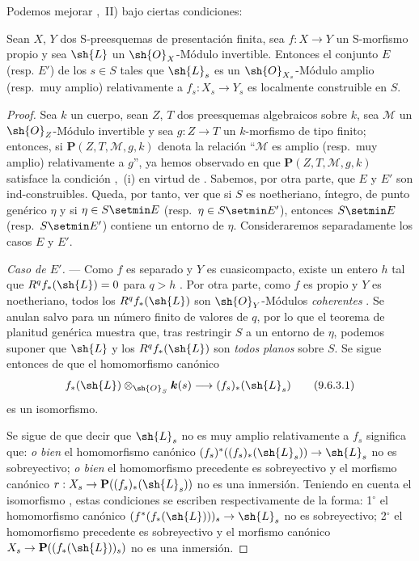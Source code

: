 Podemos mejorar ,~II) bajo ciertas condiciones:

\begin{proposition}[9.6.3]
\label{IV.9.6.3}
Sean $X$, $Y$ dos S-preesquemas de presentación finita, sea $f:X\to Y$ un S-morfismo \textup{propio} y sea $\sh{L}$ un $\sh{O}_X$-Módulo invertible.
Entonces el conjunto $E$ \textup{(resp.} $E'$\textup{)} de los $s\in S$ tales que $\sh{L}_s$ es un $\sh{O}_{X_s}$-Módulo amplio \textup{(resp.}\ muy amplio\textup{)} relativamente a $f_s:X_s\to Y_s$ es localmente construible en $S$.
\end{proposition}

\begin{proof}
Sea $k$ un cuerpo, sean $Z$, $T$ dos preesquemas algebraicos sobre $k$, sea $\mathscr{M}$ un $\sh{O}_Z$-Módulo invertible y sea $g:Z\to T$ un $k$-morfismo de tipo finito; entonces, si $\boldsymbol{P}(Z,T,\mathscr{M},g,k)$ denota la relación ``$\mathscr{M}$ es amplio (resp.\ muy amplio) relativamente a $g$'', ya hemos observado en  que $\boldsymbol{P}(Z,T,\mathscr{M},g,k)$ satisface la condición ,~(i) en virtud de .
Sabemos, por otra parte, que $E$ y $E'$ son ind-construibles.
Queda, por tanto, ver que si $S$ es noetheriano, íntegro, de punto genérico $\eta$ y si $\eta\in S\setmin E$ (resp.\ $\eta\in S\setmin E'$), entonces $S\setmin E$ (resp.\ $S\setmin E'$) contiene un entorno de $\eta$.
Consideraremos separadamente los casos $E$ y $E'$.


\emph{Caso de $E'$.} ---
Como $f$ es separado y $Y$ es cuasicompacto, existe un entero $h$ tal que
$R^qf_*(\sh{L})=0$ para $q>h$ .
Por otra parte, como $f$ es propio y $Y$ es noetheriano, todos los
$R^qf_*(\sh{L})$ son $\sh{O}_Y$-Módulos \emph{coherentes} .
Se anulan salvo para un número finito de valores de $q$, por lo que el teorema de planitud genérica
 muestra que, tras restringir $S$ a un entorno de $\eta$, podemos
suponer que $\sh{L}$ y los $R^qf_*(\sh{L})$ son \emph{todos} \emph{planos} sobre $S$.
Se sigue entonces de  que el homomorfismo canónico
\begin{equation}
\label{IV.9.6.3.1}
 f_*(\sh{L})\otimes_{\sh{O}_S}\boldsymbol{k}(s)
 \longrightarrow (f_s)_*(\sh{L}_s)
 \tag{9.6.3.1}
\end{equation}
es un isomorfismo.

Se sigue de  que decir que $\sh{L}_s$ no es muy amplio relativamente a $f_s$ significa que: \emph{o bien} el homomorfismo canónico $(f_s)^*((f_s)_*(\sh{L}_s))\to\sh{L}_s$ no es sobreyectivo; \emph{o bien} el homomorfismo precedente es sobreyectivo y el morfismo canónico $r:X_s\to\mathbf{P}((f_s)_*(\sh{L}_s))$ no es una inmersión.
Teniendo en cuenta el isomorfismo , estas condiciones se escriben respectivamente de la forma: 1$^\circ$ el homomorfismo canónico $(f^*(f_*(\sh{L})))_s\to\sh{L}_s$ no es sobreyectivo; 2$^\circ$ el homomorfismo precedente es sobreyectivo y el morfismo canónico $X_s\to\mathbf{P}((f_*(\sh{L}))_s)$ no es una inmersión.


\end{proof}
